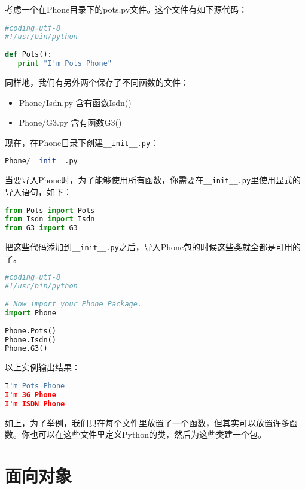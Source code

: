 考虑一个在Phone目录下的pots.py文件。这个文件有如下源代码：
\begin{lstlisting}[language=Python]
#coding=utf-8
#!/usr/bin/python
 
def Pots():
   print "I'm Pots Phone"
\end{lstlisting}
同样地，我们有另外两个保存了不同函数的文件：
\begin{itemize}
\item Phone/Isdn.py 含有函数Isdn()
\item Phone/G3.py 含有函数G3()
\end{itemize}
现在，在Phone目录下创建\verb|__init__.py|：
\begin{lstlisting}[language=Python]
Phone/__init__.py
\end{lstlisting}

当要导入Phone时，为了能够使用所有函数，你需要在\verb|__init__.py|里使用显式的导入语句，如下：
\begin{lstlisting}[language=Python]
from Pots import Pots
from Isdn import Isdn
from G3 import G3
\end{lstlisting}
把这些代码添加到\verb|__init__.py|之后，导入Phone包的时候这些类就全都是可用的了。
\begin{lstlisting}[language=Python]
#coding=utf-8
#!/usr/bin/python
 
# Now import your Phone Package.
import Phone
 
Phone.Pots()
Phone.Isdn()
Phone.G3()
\end{lstlisting}
以上实例输出结果：
\begin{lstlisting}[language=Python]
I'm Pots Phone
I'm 3G Phone
I'm ISDN Phone
\end{lstlisting}
如上，为了举例，我们只在每个文件里放置了一个函数，但其实可以放置许多函数。你也可以在这些文件里定义Python的类，然后为这些类建一个包。




\section{面向对象}
